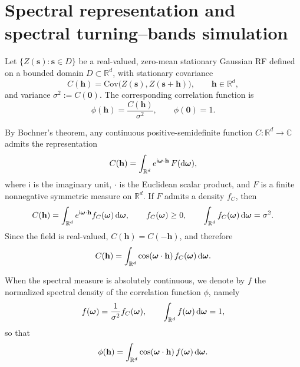 \documentclass[
  12pt]{article}
\begin{document}
\section{Spectral representation and spectral turning--bands simulation}
\label{sec2}

Let $\{Z(\mathbf{s}) : \mathbf{s}\in D\}$ be a real-valued, zero-mean stationary Gaussian RF defined on a bounded domain
$D\subset\mathbb{R}^d$, with stationary covariance
\[
C(\mathbf{h})=\mathrm{Cov}\!\bigl(Z(\mathbf{s}),Z(\mathbf{s}+\mathbf{h})\bigr),
\qquad
\mathbf{h}\in\mathbb{R}^d,
\]
and variance $\sigma^2:=C(\mathbf{0})$.
The corresponding correlation function is
\[
\phi(\mathbf{h})=\frac{C(\mathbf{h})}{\sigma^2},
\qquad
\phi(\mathbf{0})=1.
\]

By Bochner's theorem, any continuous positive-semidefinite function $C:\mathbb{R}^d\to\mathbb{C}$ admits the representation \citep{Yaglom:1987}
\begin{equation}\label{eq:bochner}
C(\mathbf{h})=\int_{\mathbb{R}^d} e^{\mathsf{i}\boldsymbol{\omega}\cdot\mathbf{h}}\,F({\rm d}\boldsymbol{\omega}),
\end{equation}
where $\mathsf{i}$ is the imaginary unit, $\cdot$ is the Euclidean scalar product, and $F$ is a finite nonnegative symmetric measure on $\mathbb{R}^d$.
If $F$ admits a density $f_C$, then
\[
C(\mathbf{h})=\int_{\mathbb{R}^d} e^{\mathsf{i}\boldsymbol{\omega}\cdot\mathbf{h}} f_C(\boldsymbol{\omega})\,{\rm d}\boldsymbol{\omega},
\qquad
f_C(\boldsymbol{\omega})\ge 0,
\qquad
\int_{\mathbb{R}^d}f_C(\boldsymbol{\omega})\,{\rm d}\boldsymbol{\omega}=\sigma^2.
\]
Since the field is real-valued, $C(\mathbf{h})=C(-\mathbf{h})$, and therefore
\[
C(\mathbf{h})=\int_{\mathbb{R}^d}\cos(\boldsymbol{\omega}\cdot\mathbf{h})\,f_C(\boldsymbol{\omega})\,{\rm d}\boldsymbol{\omega}.
\]

When the spectral measure is absolutely continuous, we denote by $f$ the normalized spectral density of the correlation function $\phi$, namely
\[
f(\boldsymbol{\omega})=\frac{1}{\sigma^2}f_C(\boldsymbol{\omega}),
\qquad
\int_{\mathbb{R}^d}f(\boldsymbol{\omega})\,{\rm d}\boldsymbol{\omega}=1,
\]
so that
\begin{equation}\label{eq:spectral-corr}
\phi(\mathbf{h})
=\int_{\mathbb{R}^d}\cos(\boldsymbol{\omega}\cdot\mathbf{h})\,f(\boldsymbol{\omega})\,{\rm d}\boldsymbol{\omega}.
\end{equation}
\end{document}
